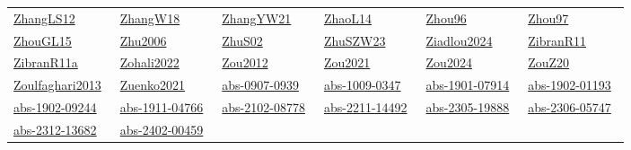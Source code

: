 \begin{longtable}{*{6}{l}}
\href{../scheduling/works/ZhangLS12.pdf}{ZhangLS12}~\cite{ZhangLS12} & \href{../scheduling/works/ZhangW18.pdf}{ZhangW18}~\cite{ZhangW18} & \href{../scheduling/works/ZhangYW21.pdf}{ZhangYW21}~\cite{ZhangYW21} & \href{../scheduling/works/ZhaoL14.pdf}{ZhaoL14}~\cite{ZhaoL14} & \href{../scheduling/works/Zhou96.pdf}{Zhou96}~\cite{Zhou96} & \href{../scheduling/works/Zhou97.pdf}{Zhou97}~\cite{Zhou97}\\ 
\href{../scheduling/works/ZhouGL15.pdf}{ZhouGL15}~\cite{ZhouGL15} & \href{../}{Zhu2006}~\cite{Zhu2006} & \href{../scheduling/works/ZhuS02.pdf}{ZhuS02}~\cite{ZhuS02} & \href{../scheduling/works/ZhuSZW23.pdf}{ZhuSZW23}~\cite{ZhuSZW23} & \href{../scheduling/works/Ziadlou2024.pdf}{Ziadlou2024}~\cite{Ziadlou2024} & \href{../scheduling/works/ZibranR11.pdf}{ZibranR11}~\cite{ZibranR11}\\ 
\href{../scheduling/works/ZibranR11a.pdf}{ZibranR11a}~\cite{ZibranR11a} & \href{../}{Zohali2022}~\cite{Zohali2022} & \href{../scheduling/works/Zou2012.pdf}{Zou2012}~\cite{Zou2012} & \href{../scheduling/works/Zou2021.pdf}{Zou2021}~\cite{Zou2021} & \href{../scheduling/works/Zou2024.pdf}{Zou2024}~\cite{Zou2024} & \href{../scheduling/works/ZouZ20.pdf}{ZouZ20}~\cite{ZouZ20}\\ 
\href{../}{Zoulfaghari2013}~\cite{Zoulfaghari2013} & \href{../scheduling/works/Zuenko2021.pdf}{Zuenko2021}~\cite{Zuenko2021} & \href{../scheduling/works/abs-0907-0939.pdf}{abs-0907-0939}~\cite{abs-0907-0939} & \href{../scheduling/works/abs-1009-0347.pdf}{abs-1009-0347}~\cite{abs-1009-0347} & \href{../scheduling/works/abs-1901-07914.pdf}{abs-1901-07914}~\cite{abs-1901-07914} & \href{../scheduling/works/abs-1902-01193.pdf}{abs-1902-01193}~\cite{abs-1902-01193}\\ 
\href{../scheduling/works/abs-1902-09244.pdf}{abs-1902-09244}~\cite{abs-1902-09244} & \href{../scheduling/works/abs-1911-04766.pdf}{abs-1911-04766}~\cite{abs-1911-04766} & \href{../scheduling/works/abs-2102-08778.pdf}{abs-2102-08778}~\cite{abs-2102-08778} & \href{../scheduling/works/abs-2211-14492.pdf}{abs-2211-14492}~\cite{abs-2211-14492} & \href{../scheduling/works/abs-2305-19888.pdf}{abs-2305-19888}~\cite{abs-2305-19888} & \href{../scheduling/works/abs-2306-05747.pdf}{abs-2306-05747}~\cite{abs-2306-05747}\\ 
\href{../scheduling/works/abs-2312-13682.pdf}{abs-2312-13682}~\cite{abs-2312-13682} & \href{../scheduling/works/abs-2402-00459.pdf}{abs-2402-00459}~\cite{abs-2402-00459} & \end{longtable}
